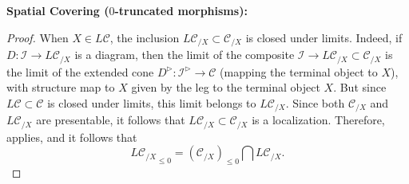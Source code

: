 \textbf{Spatial Covering ($0$-truncated morphisms):}

\begin{proof}
    When $X\in L\mathcal{C}$, the inclusion $L\mathcal{C}_{/X}\subset \mathcal{C}_{/X}$ is closed under limits. Indeed, if $D:\mathscr{I}\to L\mathcal{C}_{/X}$ is a diagram, then the limit of the composite $\mathscr{I}\to L\mathcal{C}_{/X}\subset \mathcal{C}_{/X}$ is the limit of the extended cone $D^\triangleright:\mathscr{I}^{\triangleright}\to \mathcal{C}$ (mapping the terminal object to $X$), with structure map to $X$ given by the leg to the terminal object $X$. But since $L\mathcal{C}\subset \mathcal{C}$ is closed under limits, this limit belongs to $L\mathcal{C}_{/X}$. Since both $\mathcal{C}_{/X}$ and $L\mathcal{C}_{/X}$ are presentable, it follows that $L\mathcal{C}_{/X}\subset \mathcal{C}_{/X}$ is a localization. Therefore,  applies, and it follows that $$ {L\mathcal{C}_{/X}}_{\leq 0}= ({\mathcal{C}_{/X}})_{\leq 0}\bigcap L\mathcal{C}_{/X}.$$ 
\end{proof}

